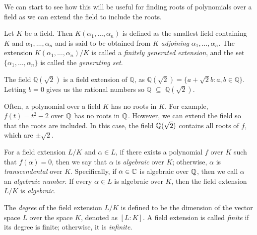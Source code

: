  We can start to see how this will be useful for finding roots of polynomials over a field as we can extend the field to include the roots.

\begin{definition}
    Let $K$ be a field. Then $K(\alpha_1, \dots, \alpha_n)$ is defined as the smallest field containing $K$ and $\alpha_1, \dots, \alpha_n$ and is said to be obtained from $K$ \textit{adjoining} $\alpha_1, \dots, \alpha_n$. The extension $K(\alpha_1, \dots, \alpha_n) / K$ is called a \textit{finitely generated extension}, and the set $\{\alpha_1, \dots, \alpha_n\}$ is called the \textit{generating set}. 
\end{definition}

\begin{example} \label{exm:field-extension}
The field \(\mathbb{Q}(\sqrt{2})\) is a field extension of \(\mathbb{Q}\), as \(\mathbb{Q}(\sqrt{2}) = \{a + \sqrt{2}b : a,b \in \mathbb{Q}\}\). Letting \(b = 0\) gives us the rational numbers so \(\mathbb{Q}\) $\subseteq$ \(\mathbb{Q}(\sqrt{2})\).
\end{example}

Often, a polynomial over a field $K$ has no roots in $K$. For example, $f(t) = t^2 - 2$ over $\mathbb Q$ has no roots in $\mathbb Q$. However, we can extend the field so that the roots are included. In this case, the field $\mathbb Q(\sqrt 2)$ contains all roots of $f$, which are $\pm \sqrt 2$.

\begin{definition}
For a field extension $L/K$ and \(\alpha \in L\), if there exists a polynomial \(f\) over \(K\) such that \(f(\alpha)=0\), then we say that \(\alpha\) is \textit{algebraic} over $K$; otherwise,  \(\alpha\) is \textit{transcendental} over \(K\). Specifically, if $\alpha \in \mathbb C$ is algebraic over $\mathbb Q$, then we call $\alpha$ an \textit{algebraic number}. If every $\alpha \in L$ is algebraic over  $K$, then the field extension $L/K$ is \textit{algebraic}.

\end{definition}


\begin{definition}
    The \textit{degree} of the field extension $L/K$ is defined to be the dimension of the vector space $L$ over the space $K$, denoted as $[L:K]$.
    A field extension is called \textit{finite} if its degree is finite; otherwise, it is \textit{infinite}. 
\end{definition}



